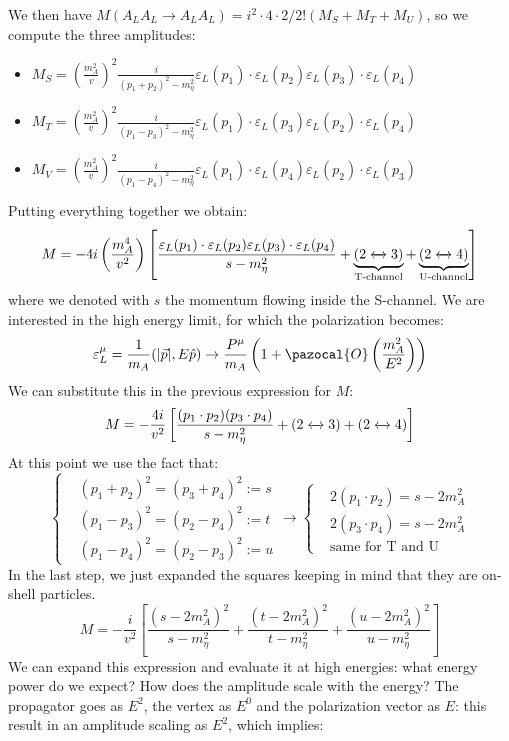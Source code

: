 \documentclass[../main.tex]{subfiles}
\begin{document}
We then have $M(A_LA_L\to A_LA_L)=i^2\cdot4\cdot2/2!(M_S+M_T+M_U)$, so we compute the three amplitudes:
\begin{itemize}
    \item $M_S=\left(\frac{m_A^2}{v}\right)^2\frac{i}{(p_1+p_2)^2-m_\eta^2}\varepsilon_L(p_1)\cdot\varepsilon_L(p_2)\varepsilon_L(p_3)\cdot\varepsilon_L(p_4)$
    \item $M_T=\left(\frac{m_A^2}{v}\right)^2\frac{i}{(p_1-p_3)^2-m_\eta^2}\varepsilon_L(p_1)\cdot\varepsilon_L(p_3)\varepsilon_L(p_2)\cdot\varepsilon_L(p_4)$
    \item $M_V=\left(\frac{m_A^2}{v}\right)^2\frac{i}{(p_1-p_4)^2-m_\eta^2}\varepsilon_L(p_1)\cdot\varepsilon_L(p_4)\varepsilon_L(p_2)\cdot\varepsilon_L(p_3)$
\end{itemize}
Putting everything together we obtain:
\[
M=-4i\left(\frac{m_A^4}{v^2}\right)\left[\frac{\varepsilon_L(p_1)\cdot\varepsilon_L(p_2)\varepsilon_L(p_3)\cdot\varepsilon_L(p_4)}{s-m_\eta^2}+\underbrace{(2\xleftrightarrow[]{}3)}_{\text{T-channel}}+\underbrace{(2\xleftrightarrow[]{}4)}_{\text{U-channel}}\right]
\]
where we denoted with $s$ the momentum flowing inside the S-channel. We are interested in the high energy limit, for which the polarization becomes:
\[
\varepsilon_L^\mu=\frac{1}{m_A}(|\Vec{p}|,E\hat{p})\to\frac{P^\mu}{m_A}\left(1+\pazocal{O}\left(\frac{m_A^2}{E^2}\right)\right)
\]
We can substitute this in the previous expression for $M$:
\[
M=-\frac{4i}{v^2}\left[\frac{(p_1\cdot p_2)(p_3\cdot p_4)}{s-m_\eta^2}+(2\xleftrightarrow[]{}3)+(2\xleftrightarrow[]{}4)\right]
\]
At this point we use the fact that:
\[
\left\{
\begin{aligned}
&(p_1+p_2)^2=(p_3+p_4)^2:=s\\
&(p_1-p_3)^2=(p_2-p_4)^2:=t\\
&(p_1-p_4)^2=(p_2-p_3)^2:=u
\end{aligned}
\right.
\to
\left\{
\begin{aligned}
&2(p_1\cdot p_2)=s-2m_A^2\\    
&2(p_3\cdot p_4)=s-2m_A^2\\
&\text{same for T and U}
\end{aligned}
\right.
\]
In the last step, we just expanded the squares keeping in mind that they are on-shell particles.
\[
M=-\frac{i}{v^2}\left[\frac{(s-2m_A^2)^2}{s-m_\eta^2}+\frac{(t-2m_A^2)^2}{t-m_\eta^2}+\frac{(u-2m_A^2)^2}{u-m_\eta^2}\right]
\]
We can expand this expression and evaluate it at high energies: what energy power do we expect? How does the amplitude scale with the energy? The propagator goes as $E^2$, the vertex as $E^0$ and the polarization vector as $E$: this result in an amplitude scaling as $E^2$, which implies:
\end{document}
